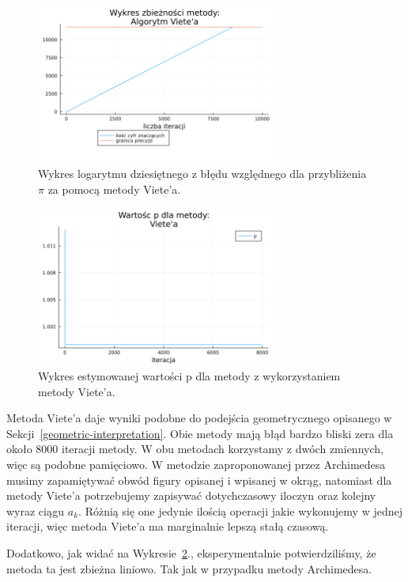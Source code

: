 \begin{figure}[!h]\centering
    \renewcommand{\figurename}{Wykres}
    \includegraphics[width=0.7\textwidth]{../prog/viete_log_error.png}
    \caption{Wykres logarytmu dziesiętnego z błędu względnego dla przybliżenia $\pi$ za pomocą metody Viete'a.}
    \label{viete-error}
\end{figure}

\begin{figure}[!h]\centering
    \renewcommand{\figurename}{Wykres}
    \includegraphics[width=0.7\textwidth]{../prog/viete_error_ratio.png}
    \caption{Wykres estymowanej wartości p dla metody z wykorzystaniem metody Viete'a.}
    \label{viete-convergence}
\end{figure}

Metoda Viete'a daje wyniki podobne do podejścia geometrycznego opisanego w Sekcji~\ref{geometric-interpretation}. Obie metody mają błąd bardzo bliski zera dla około 8000 iteracji metody. W obu metodach korzystamy z dwóch zmiennych, więc są podobne pamięciowo. W metodzie zaproponowanej przez Archimedesa musimy zapamiętywać obwód figury opisanej i wpisanej w okrąg, natomiast dla metody Viete'a potrzebujemy zapisywać dotychczasowy iloczyn oraz kolejny wyraz ciągu $a_k$. Różnią się one jedynie ilością operacji jakie wykonujemy w jednej iteracji, więc metoda Viete'a ma marginalnie lepszą stałą czasową.

Dodatkowo, jak widać na Wykresie~\ref{viete-convergence}., eksperymentalnie potwierdziliśmy, że metoda ta jest zbieżna liniowo. Tak jak w przypadku metody Archimedesa.
